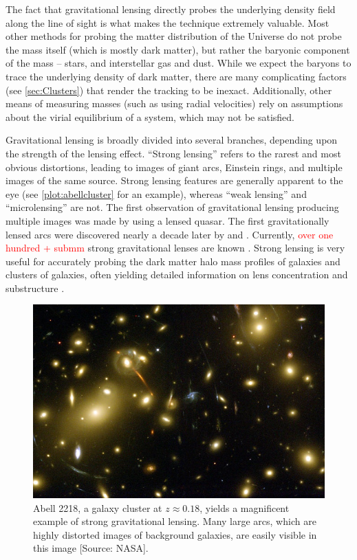 The fact that gravitational lensing directly probes the underlying density field along the line of sight is what makes the technique extremely valuable. Most other methods for probing the matter distribution of the Universe do not probe the mass itself (which is mostly dark matter), but rather the baryonic component of the mass -- stars, and interstellar gas and dust. While we expect the baryons to trace the underlying density of dark matter, there are many complicating factors (see \autoref{sec:Clusters}) that render the tracking to be inexact. Additionally, other means of measuring masses (such as using radial velocities) rely on assumptions about the virial equilibrium of a system, which may not be satisfied.

Gravitational lensing is broadly divided into several branches, depending upon the strength of the lensing effect. ``Strong lensing'' refers to the rarest and most obvious distortions, leading to images of giant arcs, Einstein rings, and multiple images of the same source. Strong lensing features are generally apparent to the eye (see \autoref{plot:abellcluster} for an example), whereas ``weak lensing'' and ``microlensing'' are not. The first observation of gravitational lensing producing multiple images was made by \citet{Walsh79} using a lensed quasar. The first gravitationally lensed arcs were discovered nearly a decade later by \citet{Lynds86} and \citet{Soucail87,Soucail88}. Currently, \textcolor{red}{over one hundred + submm} strong gravitational lenses are known \citep{Browne03,Bolton08}. Strong lensing is very useful for accurately probing the dark matter halo mass profiles of galaxies and clusters of galaxies, often yielding detailed information on lens concentration \citep{Auger10} and substructure \citep{Mao98,Dalal02}. 

\begin{figure}
\begin{center}
\includegraphics[scale=1.5]{plots_intro/Abell2218_Med.jpg}
\caption[Strong Lensing Image]{Abell 2218, a galaxy cluster at $z \approx 0.18$, yields a magnificent example of strong gravitational lensing. Many large arcs, which are highly distorted images of background galaxies, are easily visible in this image [Source: NASA].}
\label{plot:abellcluster}
\end{center}
\end{figure}

